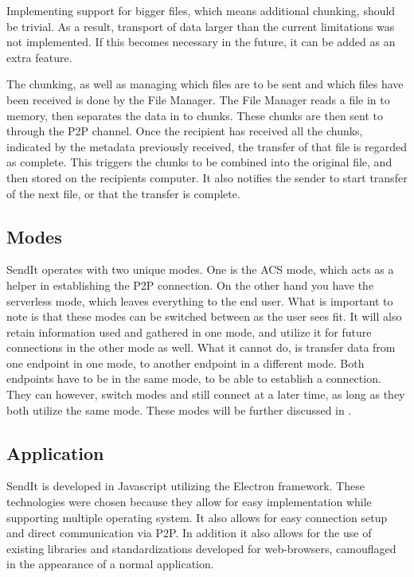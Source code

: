 		Implementing support for bigger files, which means additional chunking, should be trivial. As a result, transport of data larger than the current limitations was not implemented. If this becomes necessary in the future, it can be added as an extra feature.
		
		The chunking, as well as managing which files are to be sent and which files have been received is done by the File Manager. The File Manager reads a file in to memory, then separates the data in to chunks. These chunks are then sent to through the P2P channel. Once the recipient has received all the chunks, indicated by the metadata previously received, the transfer of that file is regarded as complete. This triggers the chunks to be combined into the original file, and then stored on the recipients computer. It also notifies the sender to start transfer of the next file, or that the transfer is complete.

	\subsection{Modes}
		SendIt operates with two unique modes. One is the ACS mode, which acts as a helper in establishing the P2P connection. On the other hand you have the serverless mode, which leaves everything to the end user. What is important to note is that these modes can be switched between as the user sees fit. It will also retain information used and gathered in one mode, and utilize it for future connections in the other mode as well. What it cannot do, is transfer data from one endpoint in one mode, to another endpoint in a different mode. Both endpoints have to be in the same mode, to be able to establish a connection. They can however, switch modes and still connect at a later time, as long as they both utilize the same mode. These modes will be further discussed in .

	\subsection{Application}
		SendIt is developed in Javascript utilizing the Electron framework. These technologies were chosen because they allow for easy implementation while supporting multiple operating system.  It also allows for easy connection setup and direct communication via P2P. In addition it also allows for the use of existing libraries and standardizations developed for web-browsers, camouflaged in the appearance of a normal application. 

